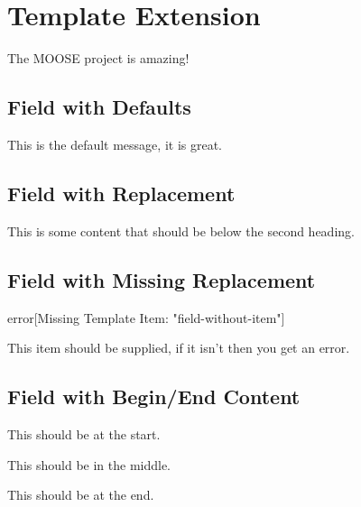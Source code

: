 
\chapter{\label{template-extension}Template Extension}
\par The MOOSE project is amazing!
\section{\label{field-with-defaults}Field with Defaults}
\par This is the default message, it is great.
\section{\label{field-with-replacement}Field with Replacement}
\par This is some content that should be below the second heading.
\section{\label{field-with-missing-replacement}Field with Missing Replacement}
\begin{alert}[error]{error}[Missing Template Item: "field-without-item"]

\par This item should be supplied, if it isn't then you get an error.
\end{alert}

\section{\label{field-with-begin-end-content}Field with Begin/End Content}
\par This should be at the start.
\par This should be in the middle.
\par This should be at the end.